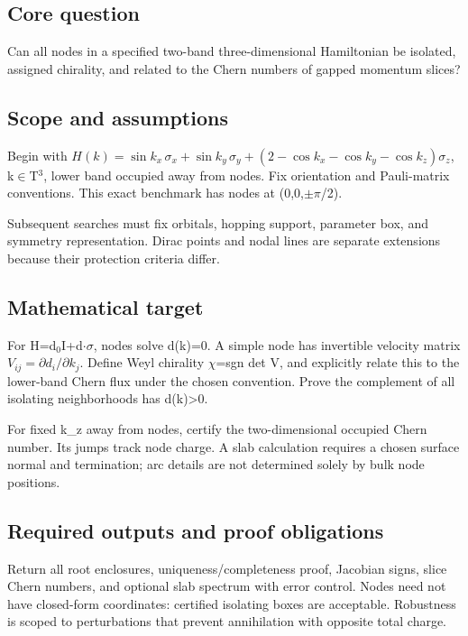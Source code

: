 \documentclass[
  11pt,
]{article}
\begin{document}
\subsection{Core question}

Can all nodes in a specified two-band three-dimensional Hamiltonian be
isolated, assigned chirality, and related to the Chern numbers of gapped
momentum slices?

\subsection{Scope and assumptions}

Begin with
\(H(k)=\sin k_x\,\sigma_x+\sin k_y\,\sigma_y+(2-\cos k_x-\cos k_y-\cos k_z)\sigma_z\),
k\ensuremath{\in}T\ensuremath{{}^{3}}, lower band occupied away from
nodes. Fix orientation and Pauli-matrix conventions. This exact
benchmark has nodes at (0,0,\ensuremath{\pm}\ensuremath{\pi}/2).

Subsequent searches must fix orbitals, hopping support, parameter box,
and symmetry representation. Dirac points and nodal lines are separate
extensions because their protection criteria differ.

\subsection{Mathematical target}

For H=d\ensuremath{{}_{0}}I+d\ensuremath{\cdot}\ensuremath{\sigma},
nodes solve d(k)=0. A simple node has invertible velocity matrix
\(V_{ij}=\partial d_i/\partial k_j\). Define Weyl chirality
\ensuremath{\chi}=sgn det V, and explicitly relate this to the
lower-band Chern flux under the chosen convention. Prove the complement
of all isolating neighborhoods has \textbar d(k)\textbar\textgreater0.

For fixed k\_z away from nodes, certify the two-dimensional occupied
Chern number. Its jumps track node charge. A slab calculation requires a
chosen surface normal and termination; arc details are not determined
solely by bulk node positions.

\subsection{Required outputs and proof obligations}

Return all root enclosures, uniqueness/completeness proof, Jacobian
signs, slice Chern numbers, and optional slab spectrum with error
control. Nodes need not have closed-form coordinates: certified
isolating boxes are acceptable. Robustness is scoped to perturbations
that prevent annihilation with opposite total charge.
\end{document}
